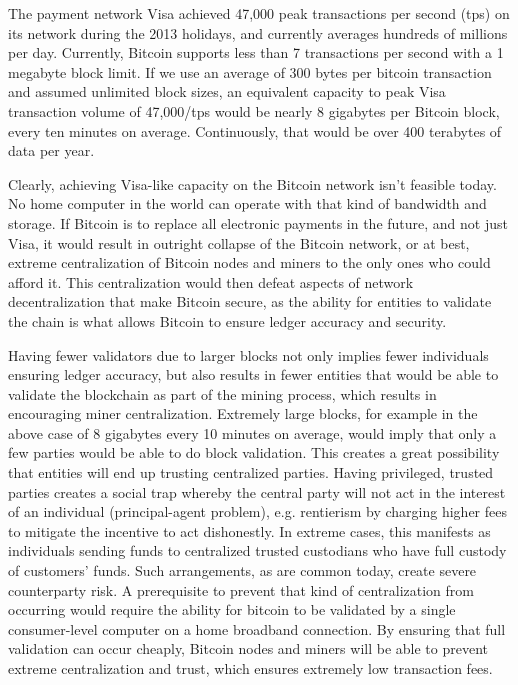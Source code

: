 \documentclass[letterpaper,11pt]{article}
\begin{document}
The payment network Visa achieved 47,000 peak transactions per second (tps) on
its network during the 2013 holidays\cite{visa}, and currently averages hundreds
of millions per day. Currently, Bitcoin supports less than 7 transactions per
second with a 1 megabyte block limit. If we use an average of 300 bytes per
bitcoin transaction and assumed unlimited block sizes, an equivalent capacity to
peak Visa transaction volume of 47,000/tps would be nearly 8 gigabytes per
Bitcoin block, every ten minutes on average. Continuously, that would be over
400 terabytes of data per year.

Clearly, achieving Visa-like capacity on the Bitcoin network isn't feasible
today. No home computer in the world can operate with that kind of bandwidth and
storage. If Bitcoin is to replace all electronic payments in the future, and not
just Visa, it would result in outright collapse of the Bitcoin network, or at
best, extreme centralization of Bitcoin nodes and miners to the only ones who
could afford it. This centralization would then defeat aspects of network
decentralization that make Bitcoin secure, as the ability for entities to
validate the chain is what allows Bitcoin to ensure ledger accuracy and
security.

Having fewer validators due to larger blocks not only implies fewer individuals
ensuring ledger accuracy, but also results in fewer entities that would be able
to validate the blockchain as part of the mining process, which results in
encouraging miner centralization. Extremely large blocks, for example in the
above case of 8 gigabytes every 10 minutes on average, would imply that only a
few parties would be able to do block validation. This creates a great
possibility that entities will end up trusting centralized parties. Having
privileged, trusted parties creates a social trap whereby the central party will
not act in the interest of an individual (principal-agent problem), e.g.
rentierism by charging higher fees to mitigate the incentive to act dishonestly.
In extreme cases, this manifests as individuals sending funds to centralized
trusted custodians who have full custody of customers' funds. Such arrangements,
as are common today, create severe counterparty risk. A prerequisite to prevent
that kind of centralization from occurring would require the ability for bitcoin
to be validated by a single consumer-level computer on a home broadband
connection. By ensuring that full validation can occur cheaply, Bitcoin nodes
and miners will be able to prevent extreme centralization and trust, which
ensures extremely low transaction fees.
\end{document}
